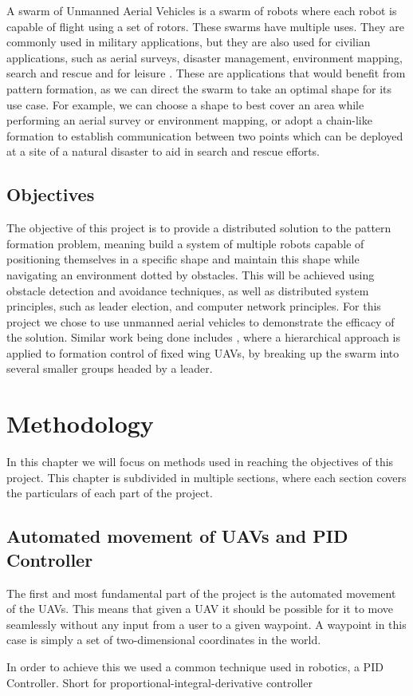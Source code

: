 A swarm of Unmanned Aerial Vehicles is a swarm of robots where each robot is capable of flight using
a set of rotors. These swarms have multiple uses. They are commonly used in military applications, but
they are also used for civilian applications, such as aerial surveys, disaster management, environment
mapping, search and rescue and for leisure \autocite{TA19}. These are applications that would benefit
from pattern formation, as we can direct the swarm to take an optimal shape for its use case. For 
example, we can choose a shape to best cover an area while performing an aerial survey or environment
mapping, or adopt a chain-like formation to establish communication between two points \autocite{MS20}
which can be deployed at a site of a natural disaster to aid in search and rescue efforts.


\section{Objectives}

The objective of this project is to provide a distributed solution to the pattern formation problem, meaning
build a system of multiple robots capable of positioning themselves in a specific shape and maintain this
shape while navigating an environment dotted by obstacles. This will be achieved using obstacle detection
and avoidance techniques, as well as distributed system principles, such as leader election, and computer
network principles. For this project we chose to use unmanned aerial vehicles to demonstrate the efficacy
of the solution. Similar work being done includes \autocite{HC21}, where a hierarchical approach is applied
to formation control of fixed wing UAVs, by breaking up the swarm into several smaller groups headed by a 
leader.


\chapter{Methodology}

In this chapter we will focus on methods used in reaching the objectives of this project. This chapter
is subdivided in multiple sections, where each section covers the particulars of each part of the 
project.

\section{Automated movement of UAVs and PID Controller}

The first and most fundamental part of the project is the automated movement of the UAVs. 
This means that given a UAV it should be possible for it to move seamlessly without
any input from a user to a given waypoint. A waypoint in this case is simply a set of
two-dimensional coordinates in the world.

In order to achieve this we used a common technique used in robotics, a PID Controller. 
Short for proportional-integral-derivative controller



\printbibliography

